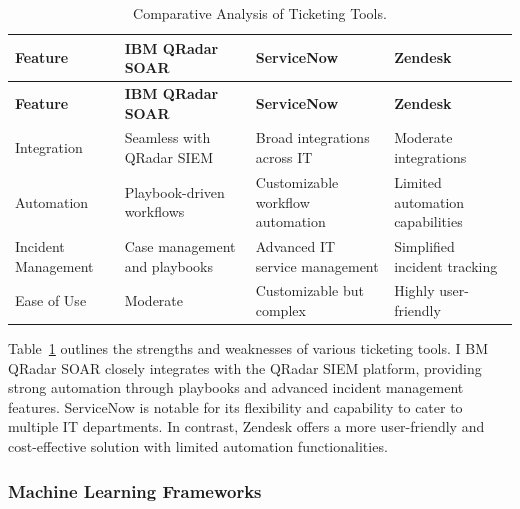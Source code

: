 \begin{longtable}{@{}p{3cm}p{3cm}p{3cm}p{3cm}@{}}
    \caption{Comparative Analysis of Ticketing Tools.}
    \label{tab:tt_ca} \\
    \toprule
    \textbf{Feature} & \textbf{IBM QRadar SOAR} & \textbf{ServiceNow} & \textbf{Zendesk} \\
    \midrule
    \endfirsthead
    \toprule
    \textbf{Feature} & \textbf{IBM QRadar SOAR} & \textbf{ServiceNow} & \textbf{Zendesk} \\
    \midrule
    \endhead
    \bottomrule
    \endfoot
    \bottomrule
    \endlastfoot
    Integration & Seamless with QRadar SIEM & Broad integrations across IT & Moderate integrations \\
    Automation & Playbook-driven workflows & Customizable workflow automation & Limited automation capabilities \\
    Incident Management & Case management and playbooks & Advanced IT service management & Simplified incident tracking \\
    Ease of Use & Moderate & Customizable but complex & Highly user-friendly \\
\end{longtable}

Table~\ref{tab:tt_ca} outlines the strengths and weaknesses of various ticketing tools. I
BM QRadar SOAR closely integrates with the QRadar SIEM platform, providing strong automation through playbooks and advanced incident management features. 
ServiceNow is notable for its flexibility and capability to cater to multiple IT departments. 
In contrast, Zendesk offers a more user-friendly and cost-effective solution with limited automation functionalities.

\subsubsection{Machine Learning Frameworks}


